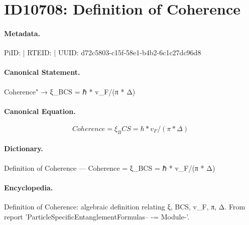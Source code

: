 \section*{ID10708: Definition of Coherence}
\paragraph{Metadata.}
PiID:  | RTEID:  | UUID: d72c5803-c15f-58e1-b4b2-6c1c27dc96d8

\paragraph{Canonical Statement.}
Coherence" → ξ\_BCS = ℏ * v\_F/(π * Δ)

\paragraph{Canonical Equation.}
\[
Coherence = ξ_BCS = ℏ * v_F/(π * Δ)
\]

\paragraph{Dictionary.}
Definition of Coherence — Coherence = ξ\_BCS = ℏ * v\_F/(π * Δ)

\paragraph{Encyclopedia.}
Definition of Coherence: algebraic definition relating ξ, BCS, v\_F, π, Δ. From report 'ParticleSpecificEntanglementFormulas-- -= Module-'.
